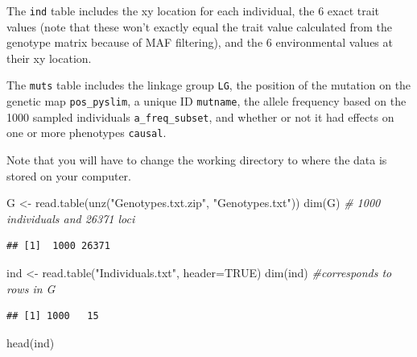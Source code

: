 \documentclass[
]{article}
\newenvironment{Shaded}{\begin{snugshade}}{\end{snugshade}}
\newcommand{\AttributeTok}[1]{\textcolor[rgb]{0.77,0.63,0.00}{#1}}
\newcommand{\CommentTok}[1]{\textcolor[rgb]{0.56,0.35,0.01}{\textit{#1}}}
\newcommand{\ConstantTok}[1]{\textcolor[rgb]{0.00,0.00,0.00}{#1}}
\newcommand{\FunctionTok}[1]{\textcolor[rgb]{0.00,0.00,0.00}{#1}}
\newcommand{\NormalTok}[1]{#1}
\newcommand{\OtherTok}[1]{\textcolor[rgb]{0.56,0.35,0.01}{#1}}
\newcommand{\StringTok}[1]{\textcolor[rgb]{0.31,0.60,0.02}{#1}}
\begin{document}
The \texttt{ind} table includes the xy location for each individual, the
6 exact trait values (note that these won't exactly equal the trait
value calculated from the genotype matrix because of MAF filtering), and
the 6 environmental values at their xy location.

The \texttt{muts} table includes the linkage group \texttt{LG}, the
position of the mutation on the genetic map \texttt{pos\_pyslim}, a
unique ID \texttt{mutname}, the allele frequency based on the 1000
sampled individuals \texttt{a\_freq\_subset}, and whether or not it had
effects on one or more phenotypes \texttt{causal}.

Note that you will have to change the working directory to where the
data is stored on your computer.

\begin{Shaded}
\begin{Highlighting}[]
\NormalTok{G }\OtherTok{\textless{}{-}} \FunctionTok{read.table}\NormalTok{(}\FunctionTok{unz}\NormalTok{(}\StringTok{"Genotypes.txt.zip"}\NormalTok{, }\StringTok{"Genotypes.txt"}\NormalTok{))}
\FunctionTok{dim}\NormalTok{(G) }\CommentTok{\# 1000 individuals and 26371 loci}
\end{Highlighting}
\end{Shaded}

\begin{verbatim}
## [1]  1000 26371
\end{verbatim}

\begin{Shaded}
\begin{Highlighting}[]
\NormalTok{ind }\OtherTok{\textless{}{-}} \FunctionTok{read.table}\NormalTok{(}\StringTok{"Individuals.txt"}\NormalTok{, }\AttributeTok{header=}\ConstantTok{TRUE}\NormalTok{)}
\FunctionTok{dim}\NormalTok{(ind) }\CommentTok{\#corresponds to rows in G}
\end{Highlighting}
\end{Shaded}

\begin{verbatim}
## [1] 1000   15
\end{verbatim}

\begin{Shaded}
\begin{Highlighting}[]
\FunctionTok{head}\NormalTok{(ind)}
\end{Highlighting}
\end{Shaded}
\end{document}
